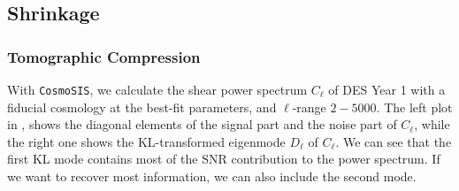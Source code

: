 \documentclass[twocolumn]{\docclass}
\begin{document}
	
	\subsection{Shrinkage}
	
	\subsubsection{Tomographic Compression}
	
	With  {\tt CosmoSIS}, we calculate the shear power spectrum $C_{\ell}$ of DES Year 1 with a fiducial cosmology at the best-fit parameters, and $\ell$-range $2-5000$. The left plot in , shows the diagonal elements of the signal part and the noise part of $C_{\ell}$, while the right one shows the KL-transformed eigenmode $D_{\ell}$ of $C_{\ell}$. We can see that the first KL mode contains most of the SNR contribution to the power spectrum. If we want to recover most information, we can also include the second mode.
	
\end{document}
